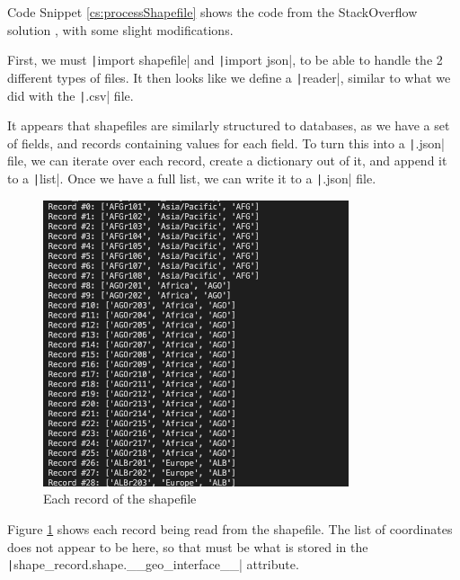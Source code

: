 \documentclass[12pt]{report}
\newcommand{\pil}[1]{\protect\texttt|#1|}
\begin{document}
Code Snippet \ref{cs:processShapefile} shows the code from the StackOverflow solution \cite{stackOverflowConvertShapefile}, with some slight modifications.

First, we must \pil{import shapefile} and \pil{import json}, to be able to handle the 2 different types of files. It then looks like we define a \pil{reader}, similar to what we did with the \pil{.csv} file.

It appears that shapefiles are similarly structured to databases, as we have a set of fields, and records containing values for each field. To turn this into a \pil{.json} file, we can iterate over each record, create a dictionary out of it, and append it to a \pil{list}. Once we have a full list, we can write it to a \pil{.json} file.

\begin{figure}[H]
\centering
\includegraphics[width=9cm]{ss5.3.png}
\caption{Each record of the shapefile}\label{fig:ss5.3}
\end{figure}

Figure \ref{fig:ss5.3} shows each record being read from the shapefile. The list of coordinates does not appear to be here, so that must be what is stored in the \pil{shape_record.shape.__geo_interface__} attribute.

\begin{center}
\end{center}
\end{document}
